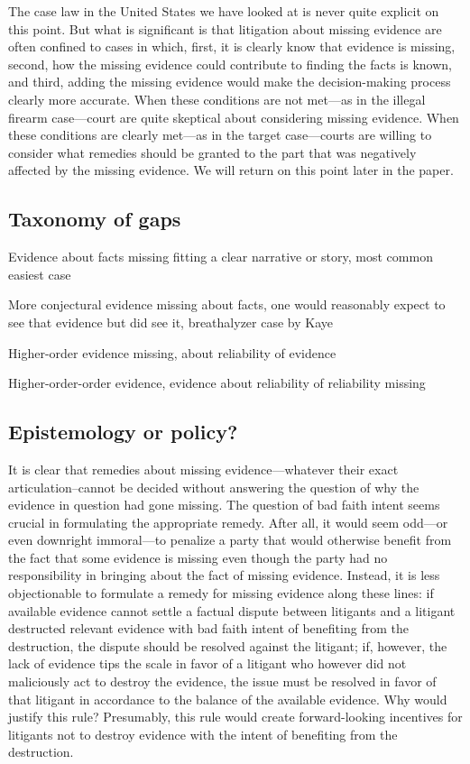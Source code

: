 \documentclass[
  10pt,
  dvipsnames,enabledeprecatedfontcommands]{scrartcl}
\begin{document}
The case law in the United States we have looked at is never quite
explicit on this point. But what is significant is that litigation about
missing evidence are often confined to cases in which, first, it is
clearly know that evidence is missing, second, how the missing evidence
could contribute to finding the facts is known, and third, adding the
missing evidence would make the decision-making process clearly more
accurate. When these conditions are not met---as in the illegal firearm
case---court are quite skeptical about considering missing evidence.
When these conditions are clearly met---as in the target case---courts
are willing to consider what remedies should be granted to the part that
was negatively affected by the missing evidence. We will return on this
point later in the paper.

\hypertarget{taxonomy-of-gaps}{%
\subsection{Taxonomy of gaps}\label{taxonomy-of-gaps}}

Evidence about facts missing fitting a clear narrative or story, most
common easiest case

More conjectural evidence missing about facts, one would reasonably
expect to see that evidence but did see it, breathalyzer case by Kaye

Higher-order evidence missing, about reliability of evidence

Higher-order-order evidence, evidence about reliability of reliability
missing

\hypertarget{epistemology-or-policy}{%
\subsection{Epistemology or policy?}\label{epistemology-or-policy}}

It is clear that remedies about missing evidence---whatever their exact
articulation--cannot be decided without answering the question of why
the evidence in question had gone missing. The question of bad faith
intent seems crucial in formulating the appropriate remedy. After all,
it would seem odd---or even downright immoral---to penalize a party that
would otherwise benefit from the fact that some evidence is missing even
though the party had no responsibility in bringing about the fact of
missing evidence. Instead, it is less objectionable to formulate a
remedy for missing evidence along these lines: if available evidence
cannot settle a factual dispute between litigants and a litigant
destructed relevant evidence with bad faith intent of benefiting from
the destruction, the dispute should be resolved against the litigant;
if, however, the lack of evidence tips the scale in favor of a litigant
who however did not maliciously act to destroy the evidence, the issue
must be resolved in favor of that litigant in accordance to the balance
of the available evidence. Why would justify this rule? Presumably, this
rule would create forward-looking incentives for litigants not to
destroy evidence with the intent of benefiting from the destruction.
\end{document}
